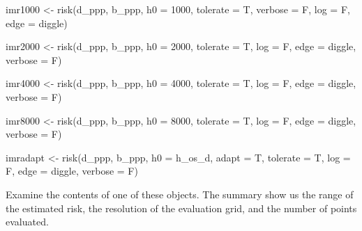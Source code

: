 \documentclass[
]{book}
\newenvironment{Shaded}{\begin{snugshade}}{\end{snugshade}}
\newcommand{\AttributeTok}[1]{\textcolor[rgb]{0.77,0.63,0.00}{#1}}
\newcommand{\DecValTok}[1]{\textcolor[rgb]{0.00,0.00,0.81}{#1}}
\newcommand{\FunctionTok}[1]{\textcolor[rgb]{0.00,0.00,0.00}{#1}}
\newcommand{\NormalTok}[1]{#1}
\newcommand{\OtherTok}[1]{\textcolor[rgb]{0.56,0.35,0.01}{#1}}
\newcommand{\StringTok}[1]{\textcolor[rgb]{0.31,0.60,0.02}{#1}}
\begin{document}
\begin{Shaded}
\begin{Highlighting}[]
\NormalTok{imr1000 }\OtherTok{\textless{}{-}} \FunctionTok{risk}\NormalTok{(d\_ppp, b\_ppp, }\AttributeTok{h0 =} \DecValTok{1000}\NormalTok{, }
            \AttributeTok{tolerate =}\NormalTok{ T,}
            \AttributeTok{verbose =}\NormalTok{ F, }
            \AttributeTok{log =}\NormalTok{ F,}
            \AttributeTok{edge =} \StringTok{\textquotesingle{}diggle\textquotesingle{}}\NormalTok{)}

\NormalTok{imr2000 }\OtherTok{\textless{}{-}} \FunctionTok{risk}\NormalTok{(d\_ppp, b\_ppp, }\AttributeTok{h0 =} \DecValTok{2000}\NormalTok{, }
            \AttributeTok{tolerate =}\NormalTok{ T,}
            \AttributeTok{log =}\NormalTok{ F,}
            \AttributeTok{edge =} \StringTok{\textquotesingle{}diggle\textquotesingle{}}\NormalTok{,}
            \AttributeTok{verbose =}\NormalTok{ F)}

\NormalTok{imr4000 }\OtherTok{\textless{}{-}} \FunctionTok{risk}\NormalTok{(d\_ppp, b\_ppp, }\AttributeTok{h0 =} \DecValTok{4000}\NormalTok{, }
            \AttributeTok{tolerate =}\NormalTok{ T,}
            \AttributeTok{log =}\NormalTok{ F,}
            \AttributeTok{edge =} \StringTok{\textquotesingle{}diggle\textquotesingle{}}\NormalTok{,}
            \AttributeTok{verbose =}\NormalTok{ F)}

\NormalTok{imr8000 }\OtherTok{\textless{}{-}} \FunctionTok{risk}\NormalTok{(d\_ppp, b\_ppp, }\AttributeTok{h0 =} \DecValTok{8000}\NormalTok{, }
            \AttributeTok{tolerate =}\NormalTok{ T,}
            \AttributeTok{log =}\NormalTok{ F,}
            \AttributeTok{edge =} \StringTok{\textquotesingle{}diggle\textquotesingle{}}\NormalTok{,}
            \AttributeTok{verbose =}\NormalTok{ F)}

\NormalTok{imradapt }\OtherTok{\textless{}{-}} \FunctionTok{risk}\NormalTok{(d\_ppp, b\_ppp, }
                 \AttributeTok{h0 =}\NormalTok{ h\_os\_d, }
                 \AttributeTok{adapt =}\NormalTok{ T, }
                 \AttributeTok{tolerate =}\NormalTok{ T,}
                 \AttributeTok{log =}\NormalTok{ F,}
                 \AttributeTok{edge =} \StringTok{\textquotesingle{}diggle\textquotesingle{}}\NormalTok{,}
                 \AttributeTok{verbose =}\NormalTok{ F)}
\end{Highlighting}
\end{Shaded}

Examine the contents of one of these objects. The summary show us the range of the estimated risk, the resolution of the evaluation grid, and the number of points evaluated.
\end{document}
